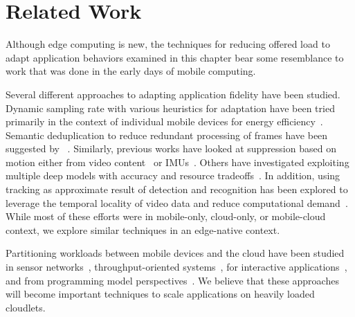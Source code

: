 \section{Related Work}
\label{sec: workload-related}

Although edge computing is new, the techniques for reducing offered load to
adapt application behaviors examined in this chapter bear some resemblance to
work that was done in the early days of mobile computing.

Several different approaches to adapting application fidelity have been studied.
Dynamic sampling rate with various heuristics for adaptation have been tried
primarily in the context of individual mobile devices for energy
efficiency~\cite{lorincz2009mercury, lorincz2008resource, vallina2012energy,
lane2010survey}. Semantic deduplication to reduce redundant processing of frames
have been suggested by ~\cite{Hu2015, kang2017noscope, hsieh2018focus,
zhang2015design}. Similarly, previous works have looked at suppression based on
motion either from video content~\cite{naderiparizi2017glimpse,
lebeckcollaborative} or IMUs~\cite{jain2015overlay}. Others have investigated
exploiting multiple deep models with accuracy and resource
tradeoffs~\cite{han2016mcdnn,jiang2018chameleon}. In addition, using tracking as
approximate result of detection and recognition has been explored to leverage
the temporal locality of video data and reduce computational
demand~\cite{wang2017scalable, chen2015glimpse, you1999hybrid}. While most of
these efforts were in mobile-only, cloud-only, or mobile-cloud context, we
explore similar techniques in an edge-native context.


Partitioning workloads between mobile devices and the cloud have been
studied in sensor networks~\cite{newton2009wishbone},
throughput-oriented systems~\cite{cuervo2010maui, yi2017lavea}, for
interactive applications~\cite{ra2011odessa, chen2015glimpse}, and
from programming model perspectives~\cite{balan2003tactics}. We believe
that these approaches will become important techniques to scale
applications on heavily loaded cloudlets.